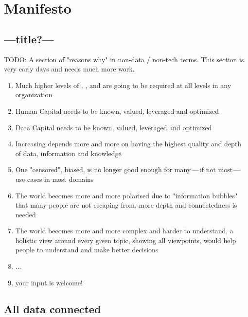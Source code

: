 \chapter{Manifesto}\label{ch:ekg-manifesto}


\section{---title?---}

TODO: A section of "reasons why" in non-data / non-tech terms. This section is very early days and needs much more work.

\begin{enumerate}
    \item Much higher levels of , ,  and
           are going to be required at all levels in any organization
    \item Human Capital needs to be known, valued, leveraged and optimized
    \item Data Capital needs to be known, valued, leveraged and optimized
    \item Increasing  depends more and more on having the highest quality and depth of data,
          information and knowledge
    \item One "censored", biased,  is no longer good enough for many\,---\,if not
          most\,---\,use cases in most domains
    \item The world becomes more and more polarised due to "information bubbles" that many people are not escaping
          from, more depth and connectedness is needed
    \item The world becomes more and more complex and harder to understand, a holistic view around every given topic,
          showing all viewpoints, would help people to understand and make better decisions
    \item ...
    \item your input is welcome!
\end{enumerate}

\section{All data connected}


